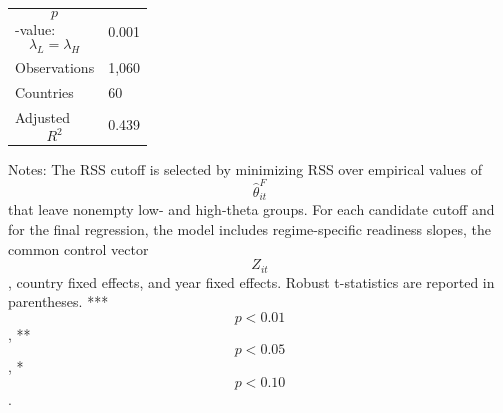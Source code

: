 \begin{table}[H]
\begin{threeparttable}
\begin{tabularx}{\textwidth}{lY}
$$p$$-value: $$\lambda_L=\lambda_H$$ & 0.001 \\
Observations & 1,060 \\
Countries & 60 \\
Adjusted $$R^2$$ & 0.439 \\
\bottomrule
\end{tabularx}
\begin{tablenotes}[flushleft]\footnotesize
\item Notes: The RSS cutoff is selected by minimizing RSS over empirical values of $$\widehat{\theta}^{F}_{it}$$ that leave nonempty low- and high-theta groups. For each candidate cutoff and for the final regression, the model includes regime-specific readiness slopes, the common control vector $$Z_{it}$$, country fixed effects, and year fixed effects. Robust t-statistics are reported in parentheses. *** $$p<0.01$$, ** $$p<0.05$$, * $$p<0.10$$.
\end{tablenotes}
\end{threeparttable}
\end{table}
